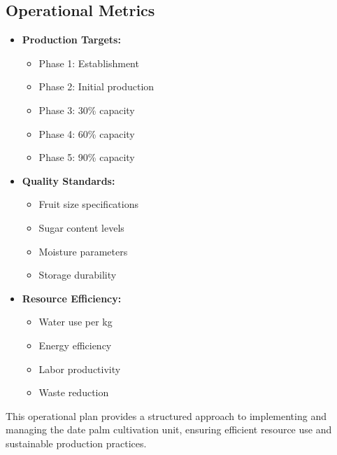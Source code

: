 \subsection{Operational Metrics}
\begin{itemize}
    \item \textbf{Production Targets:}
    \begin{itemize}
        \item Phase 1: Establishment
        \item Phase 2: Initial production
        \item Phase 3: 30\% capacity
        \item Phase 4: 60\% capacity
        \item Phase 5: 90\% capacity
    \end{itemize}
    \item \textbf{Quality Standards:}
    \begin{itemize}
        \item Fruit size specifications
        \item Sugar content levels
        \item Moisture parameters
        \item Storage durability
    \end{itemize}
    \item \textbf{Resource Efficiency:}
    \begin{itemize}
        \item Water use per kg
        \item Energy efficiency
        \item Labor productivity
        \item Waste reduction
    \end{itemize}
\end{itemize}

This operational plan provides a structured approach to implementing and managing the date palm cultivation unit, ensuring efficient resource use and sustainable production practices.
